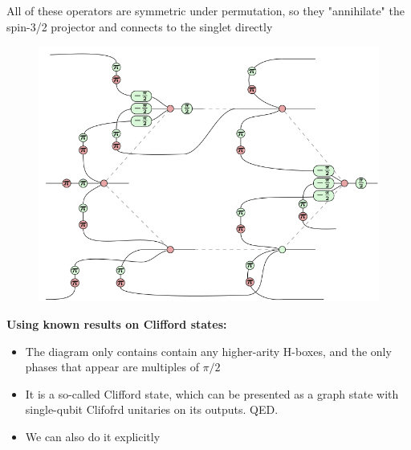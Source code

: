 \documentclass[aspectratio=169,xcolor=dvipsnames, t]{beamer}
\begin{document}
\begin{frame}
\begin{columns}
\begin{column}{0.45\textwidth}
\begin{figure}
              \end{figure}
            \end{column}
        \end{columns}
\end{frame}

\begin{frame}
    All of these operators are symmetric under permutation, so they "annihilate" the spin-3/2 projector and connects to the singlet directly
    \begin{figure}
        \centering
        \includegraphics[width=.67\textwidth]{figures/povm_measurment_simplified.png}
    \end{figure}
\end{frame}

\begin{frame}
    \textbf{Using known results on Clifford states:}
    \begin{itemize}
        \item The diagram only contains contain any higher-arity H-boxes, and the only phases that appear are multiples of $\pi/2$
        \item It is a so-called Clifford state, which can be presented as a graph state with single-qubit Clifofrd unitaries on its outputs. QED.
        \item We can also do it explicitly
    \end{itemize}
    
\end{frame}
\end{document}

